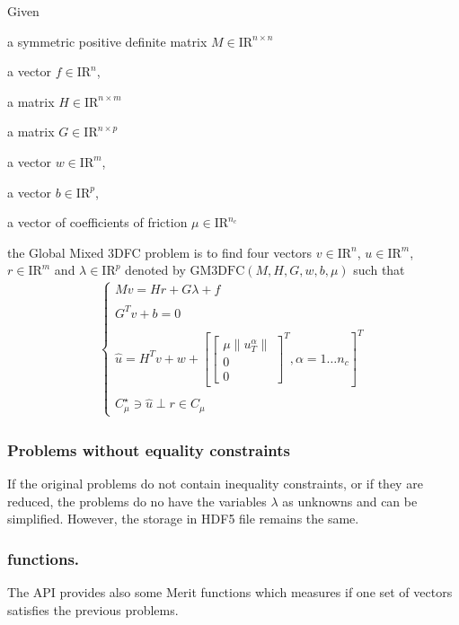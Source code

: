 Given 
\begin{DoxyItemize}
\item a symmetric positive definite matrix ${M} \in {\mathrm{I\!R}}^{n \times n}$ 
\item a vector $ {f} \in {\mathrm{I\!R}}^n$, 
\item a matrix ${H} \in {\mathrm{I\!R}}^{n \times m}$ 
\item a matrix ${G} \in {\mathrm{I\!R}}^{n \times p}$ 
\item a vector $w \in {\mathrm{I\!R}}^{m}$, 
\item a vector $b \in {\mathrm{I\!R}}^{p}$, 
\item a vector of coefficients of friction $\mu \in {\mathrm{I\!R}}^{n_c}$ 
\end{DoxyItemize}the Global Mixed 3\+D\+F\+C problem is to find four vectors $ {v} \in {\mathrm{I\!R}}^n$, $u\in{\mathrm{I\!R}}^m$, $r\in {\mathrm{I\!R}}^m$ and $\lambda \in {\mathrm{I\!R}}^p$ denoted by $\mathrm{GM3DFC}(M,H,G,w,b,\mu)$ such that \begin{eqnarray*} \begin{cases} M v = {H} {r} + G\lambda + {f} \\ \\ G^T v +b =0 \\ \\ \hat u = H^T v + w +\left[ \left[\begin{array}{c} \mu \|u^\alpha_T\|\\ 0 \\ 0 \end{array}\right]^T, \alpha = 1 \ldots n_c \right]^T \\ \\ C^\star_{\mu} \ni {\hat u} \perp r \in C_{\mu} \end{cases} \end{eqnarray*} \hypertarget{index_without}{}\subsubsection{Problems without equality constraints}\label{index_without}
If the original problems do not contain inequality constraints, or if they are reduced, the problems do no have the variables $\lambda$ as unknowns and can be simplified. However, the storage in H\+D\+F5 file remains the same.\hypertarget{index_Merict}{}\subsubsection{functions.}\label{index_Merict}
The A\+P\+I provides also some Merit functions which measures if one set of vectors satisfies the previous problems. 